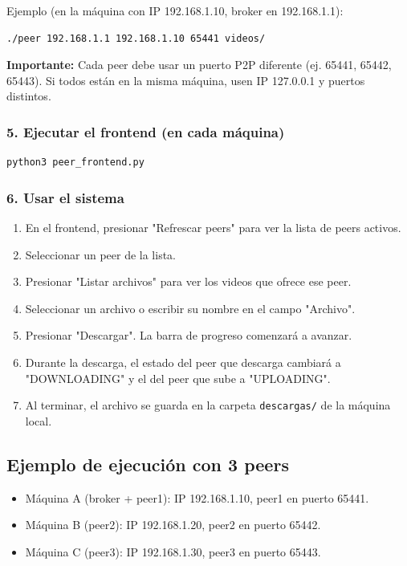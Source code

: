 \documentclass[12pt]{article}
\begin{document}
Ejemplo (en la máquina con IP 192.168.1.10, broker en 192.168.1.1):
\begin{lstlisting}[language=bash]
./peer 192.168.1.1 192.168.1.10 65441 videos/
\end{lstlisting}

\textbf{Importante:} Cada peer debe usar un puerto P2P diferente (ej. 65441, 65442, 65443). Si todos están en la misma máquina, usen IP 127.0.0.1 y puertos distintos.

\subsubsection{5. Ejecutar el frontend (en cada máquina)}
\begin{lstlisting}[language=bash]
python3 peer_frontend.py
\end{lstlisting}

\subsubsection{6. Usar el sistema}
\begin{enumerate}
    \item En el frontend, presionar "Refrescar peers" para ver la lista de peers activos.
    \item Seleccionar un peer de la lista.
    \item Presionar "Listar archivos" para ver los videos que ofrece ese peer.
    \item Seleccionar un archivo o escribir su nombre en el campo "Archivo".
    \item Presionar "Descargar". La barra de progreso comenzará a avanzar.
    \item Durante la descarga, el estado del peer que descarga cambiará a "DOWNLOADING" y el del peer que sube a "UPLOADING".
    \item Al terminar, el archivo se guarda en la carpeta \texttt{descargas/} de la máquina local.
\end{enumerate}

\subsection{Ejemplo de ejecución con 3 peers}
\begin{itemize}
    \item Máquina A (broker + peer1): IP 192.168.1.10, peer1 en puerto 65441.
    \item Máquina B (peer2): IP 192.168.1.20, peer2 en puerto 65442.
    \item Máquina C (peer3): IP 192.168.1.30, peer3 en puerto 65443.
\end{itemize}
\end{document}
